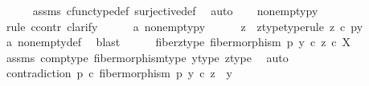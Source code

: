 \begin{isabellebody}
\ \ \ \ \isamarkupfalse%
\ assms\ cfunc{\isacharunderscore}{\kern0pt}type{\isacharunderscore}{\kern0pt}def\ surjective{\isacharunderscore}{\kern0pt}def\ \isamarkupfalse%
\ auto\isanewline
\isanewline
\ \ \isamarkupfalse%
\ {\isachardoublequoteopen}{\isasymnot}nonempty{\isacharparenleft}{\kern0pt}p\isactrlsup {\isacharminus}{\kern0pt}y{}{\isacharbraceright}{\kern0pt}{\isacharparenright}{\kern0pt}{\isachardoublequoteclose}\isanewline
\ \ \isamarkupfalse%
\ {\isacharparenleft}{\kern0pt}rule\ ccontr{\isacharcomma}{\kern0pt}\ clarify{\isacharparenright}{\kern0pt}\isanewline
\ \ \ \ \isamarkupfalse%
\ a{}{\isacharcolon}{\kern0pt}\ {\isachardoublequoteopen}nonempty{\isacharparenleft}{\kern0pt}p\isactrlsup {\isacharminus}{\kern0pt}y{}{\isacharbraceright}{\kern0pt}{\isacharparenright}{\kern0pt}{\isachardoublequoteclose}\isanewline
\ \ \ \ \isamarkupfalse%
\ z\ \ z{\isacharunderscore}{\kern0pt}type{\isacharbrackleft}{\kern0pt}type{\isacharunderscore}{\kern0pt}rule{\isacharbrackright}{\kern0pt}{\isacharcolon}{\kern0pt}\ {\isachardoublequoteopen}z\ {\isasymin}\isactrlsub c\ p\isactrlsup {\isacharminus}{\kern0pt}y{}{\isacharbraceright}{\kern0pt}{\isachardoublequoteclose}\isanewline
\ \ \ \ \ \ \isamarkupfalse%
\ a{}\ nonempty{\isacharunderscore}{\kern0pt}def\ \isamarkupfalse%
\ blast\isanewline
\ \ \ \ \isamarkupfalse%
\ fiber{\isacharunderscore}{\kern0pt}z{\isacharunderscore}{\kern0pt}type{\isacharcolon}{\kern0pt}\ {\isachardoublequoteopen}fiber{\isacharunderscore}{\kern0pt}morphism\ p\ y{}\ {\isasymcirc}\isactrlsub c\ z\ {\isasymin}\isactrlsub c\ X{\isachardoublequoteclose}\isanewline
\ \ \ \ \ \ \isamarkupfalse%
\ assms{\isacharparenleft}{\kern0pt}{}{\isacharparenright}{\kern0pt}\ comp{\isacharunderscore}{\kern0pt}type\ fiber{\isacharunderscore}{\kern0pt}morphism{\isacharunderscore}{\kern0pt}type\ y{}{\isacharunderscore}{\kern0pt}type\ z{\isacharunderscore}{\kern0pt}type\ \isamarkupfalse%
\ auto\isanewline
\ \ \ \ \isamarkupfalse%
\ contradiction{\isacharcolon}{\kern0pt}\ {\isachardoublequoteopen}p\ {\isasymcirc}\isactrlsub c\ fiber{\isacharunderscore}{\kern0pt}morphism\ p\ y{}\ {\isasymcirc}\isactrlsub c\ z\ {\isacharequal}{\kern0pt}\ y{}{\isachardoublequoteclose}\isanewline

\end{isabellebody}
